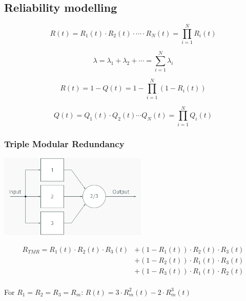 \documentclass[
  10pt,
  a4paper,
]{article}
\begin{document}
\begin{multicols*}{2}
\subsection{Reliability modelling}\label{reliability-modelling}

\begin{center}

\end{center}

\[
R(t)=R_1(t)\cdot R_2(t)\cdot\cdots\cdot R_N(t)=\prod_{i=1}^N R_i(t)
\]

\[
\lambda=\lambda_1+\lambda_2+\cdots=\sum_{i=1}^N \lambda_i
\]

\begin{center}

\end{center}

\[
R(t)=1-Q(t)=1-\prod_{i=1}^N(1-R_i(t))
\]

\[
Q(t)=Q_1(t)\cdot Q_2(t)\cdots Q_N(t)=\prod_{i=1}^N Q_i(t)
\]

\subsubsection{Triple Modular
Redundancy}\label{triple-modular-redundancy}

\begin{center}
\includegraphics[width=\textwidth,height=4cm]{images/safety/image-11.png}
\end{center}

\[
\begin{split}
R_{TMR}=R_1(t)\cdot R_2(t)\cdot R_3(t) &+ (1-R_1(t))\cdot R_2(t)\cdot R_3(t)\\
                                       &+ (1-R_2(t))\cdot R_1(t)\cdot R_3(t)\\
                                       &+ (1-R_3(t))\cdot R_1(t)\cdot R_2(t)\\
\end{split}
\]

For \(R_1=R_2=R_3=R_m\): \(R(t)=3\cdot R_m^2(t)-2\cdot R_m^3(t)\)

\begin{tcolorbox}[enhanced jigsaw, coltitle=black, toprule=.15mm, colframe=quarto-callout-important-color-frame, breakable, titlerule=0mm, title=\textcolor{quarto-callout-important-color}{\faExclamation}\hspace{0.5em}{N-Modular Redundancy}, toptitle=1mm, colback=white, leftrule=.75mm, bottomtitle=1mm, colbacktitle=quarto-callout-important-color!10!white, left=2mm, bottomrule=.15mm, rightrule=.15mm, arc=.35mm, opacityback=0, opacitybacktitle=0.6]


\end{tcolorbox}
\end{multicols*}
\end{document}

